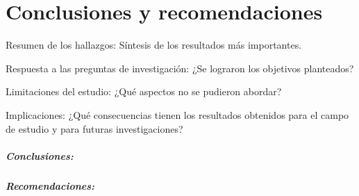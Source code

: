 \chapter*{Conclusiones y recomendaciones}

Resumen de los hallazgos: Síntesis de los resultados más importantes.

Respuesta a las preguntas de investigación: ¿Se lograron los objetivos planteados?

Limitaciones del estudio: ¿Qué aspectos no se pudieron abordar? 

Implicaciones: ¿Qué consecuencias tienen los resultados obtenidos para el campo de estudio y para futuras investigaciones?

\paragraph{Conclusiones:}
\blindtext
\paragraph{Recomendaciones:}
\blindtext
\newpage